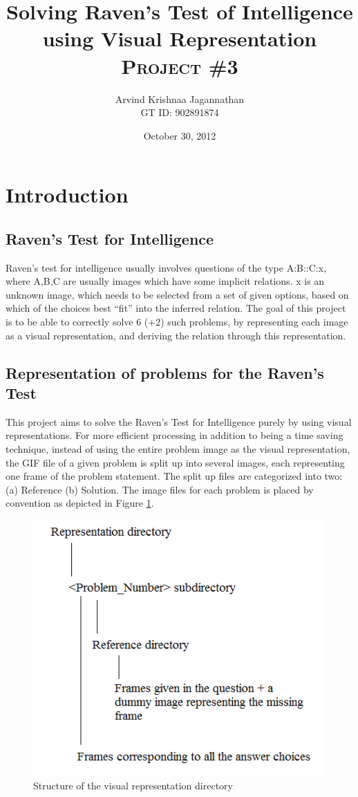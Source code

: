 \documentclass[10pt, letter]{article}
\newcommand{\doctitle}{%
Solving Raven's Test of Intelligence using Visual Representation}
\begin{document}
\title{\textbf{\doctitle}\\
\textsc{Project \#3}
}
  \author {Arvind Krishnaa Jagannathan \\ GT ID: 902891874}
   \date{October 30, 2012}
\maketitle

\section{Introduction}
\subsection*{Raven's Test for Intelligence}
Raven's test for intelligence usually involves questions of the type A:B::C:x, where A,B,C are usually images which have some implicit relations. x is an unknown image, which needs to be selected from a set of given options, based on which of the choices best ``fit'' into the inferred relation. The goal of this project is to be able to correctly solve 6 (+2) such problems, by representing each image as a visual representation, and deriving the relation through this representation.
\subsection*{Representation of problems for the Raven's Test}
This project aims to solve the Raven's Test for Intelligence purely by using visual representations. For more efficient processing in addition to being a time saving technique, instead of using the entire problem image as the visual representation, the GIF file of a given problem is split up into several images, each representing one frame of the problem statement. The split up files are categorized into two: (a) Reference (b) Solution. The image files for each problem is placed by convention as depicted in Figure \ref{fig2}.

\begin{figure}[h!]
  \centering
    \includegraphics[scale = 0.6]{Images/Fig2}
    \caption{Structure of the visual representation directory}
  \label{fig2}
\end{figure}
\end{document}
